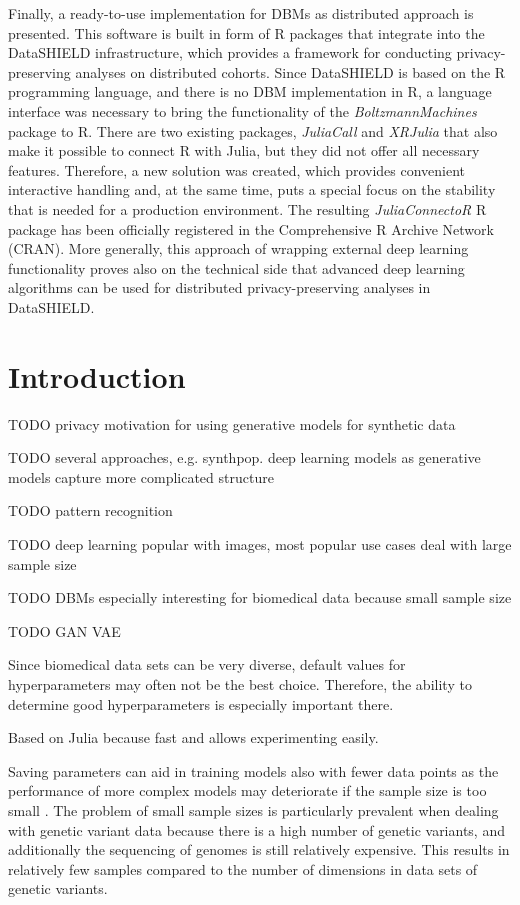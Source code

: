 \documentclass[12pt]{article}
\newcommand{\apkg}[1]{\emph{#1}}
\begin{document}
Finally, a ready-to-use implementation for DBMs as distributed approach is presented.
This software is built in form of R packages that integrate into the DataSHIELD infrastructure, which provides a framework for conducting privacy-preserving analyses on distributed cohorts.
Since DataSHIELD is based on the R programming language, and there is no DBM implementation in R, a language interface was necessary to bring the functionality of the \apkg{BoltzmannMachines} package to R.
There are two existing packages, \apkg{JuliaCall} and \apkg{XRJulia} that also make it possible to connect R with Julia, but they did not offer all necessary features.
Therefore, a new solution was created, which provides convenient interactive handling and, at the same time, puts a special focus on the stability that is needed for a production environment.
The resulting \apkg{JuliaConnectoR} R package has been officially registered in the Comprehensive R Archive Network (CRAN).
More generally, this approach of wrapping external deep learning functionality proves also on the technical side that advanced deep learning algorithms can be used for distributed privacy-preserving analyses in DataSHIELD.


\clearpage
\section{Introduction}

TODO privacy motivation for using generative models for synthetic data

TODO several approaches, e.g. synthpop. deep learning models as generative models capture more complicated structure

TODO pattern recognition

TODO deep learning popular with images, most popular use cases deal with large sample size

TODO DBMs especially interesting for biomedical data because small sample size

TODO GAN VAE


Since biomedical data sets can be very diverse, default values for hyperparameters may often not be the best choice.
Therefore, the ability to determine good hyperparameters is especially important there.

Based on Julia because fast and allows experimenting easily.


Saving parameters can aid in training models also with fewer data points as the performance of more complex models may deteriorate if the sample size is too small \citep{chan_classifier_1999}.
The problem of small sample sizes is particularly prevalent when dealing with genetic variant data 
because there is a high number of genetic variants, and additionally the sequencing of genomes is still relatively expensive.
This results in relatively few samples compared to the number of dimensions in data sets of genetic variants.
\end{document}
